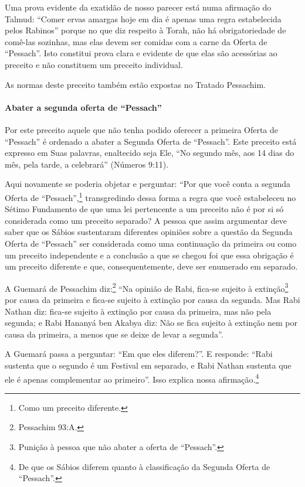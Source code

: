 Uma prova evidente da exatidão de nosso parecer está numa afirmação do
Talmud: ``Comer ervas amargas hoje em dia é apenas uma regra
estabelecida pelos Rabinos'' porque no que diz respeito à Torah, não há
obrigatoriedade de comê-las sozinhas, mas elas devem ser comidas com a
carne da Oferta de ``Pessach''. Isto constitui prova clara e evidente de
que elas são acessórias ao preceito e não constituem um preceito
individual.

As normas deste preceito também estão expostas no Tratado Pessachim.

\paragraph{Abater a segunda oferta de ``Pessach''}

Por este preceito aquele que não tenha podido oferecer a primeira Oferta
de ``Pessach'' é ordenado a abater a Segunda Oferta de ``Pessach''. Este
preceito está expresso em Suas palavras, enaltecido seja Ele, ``No
segundo mês, aos 14 dias do mês, pela tarde, a celebrará'' (Números
9:11).

Aqui novamente se poderia objetar e perguntar: ``Por que você conta a segunda Oferta de ``Pessach'',\footnote{Como um preceito diferente.} transgredindo dessa forma a regra que você estabeleceu no Sétimo Fundamento de que uma lei pertencente a um
preceito não é por si só considerada como um preceito separado? A pessoa que
assim argumentar deve saber que os Sábios sustentaram diferentes
opiniões sobre a questão da Segunda Oferta de ``Pessach'' ser considerada
como uma continuação da primeira ou como um preceito independente e a
conclusão a que se chegou foi que essa obrigação é um preceito
diferente e que, consequentemente, deve ser enumerado em separado.

A Guemará de Pessachim diz:\footnote{Pessachim 93:A.} ``Na opinião de Rabi,
fica-se sujeito à extinção\footnote{Punição à pessoa que não abater a oferta de ``Pessach''.} por causa da primeira e fica-se sujeito
à extinção por causa da segunda. Mas Rabi Nathan diz: fica-se sujeito à
extinção por causa da primeira,
mas não pela segunda; e Rabi Hananyá ben Akabya diz: Não se fica sujeito
à extinção nem por causa da primeira, a menos que se deixe de levar a
segunda''.

A Guemará passa a perguntar: ``Em que eles diferem?''. E responde:
``Rabi sustenta que o segundo é um Festival em separado, e Rabi Nathan
sustenta que ele é apenas complementar ao primeiro''. Isso explica nossa
afirmação.\footnote{De que os Sábios diferem quanto à classificação da Segunda Oferta de
  ``Pessach''.}

